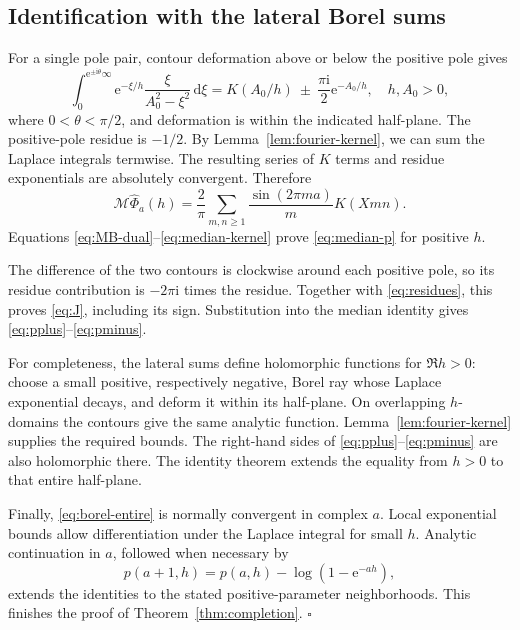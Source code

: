 \documentclass[11pt,a4paper]{article}
\numberwithin{equation}{section}
\theoremstyle{definition}
\theoremstyle{remark}\newtheorem{remark}[theorem]{Remark}
\newcommand{\ii}{\mathrm i}\newcommand{\e}{\mathrm e}
\newcommand{\dd}{\,\mathrm d}\newcommand{\id}{\operatorname{id}}
\newcommand{\Med}{\mathcal M}\newcommand{\eps}{\varepsilon}
\begin{document}
\subsection{Identification with the lateral Borel sums}
For a single pole pair, contour deformation above or below the positive
pole gives
\begin{equation}\label{eq:single-pole-laplace}
 \int_{0}^{\e^{\pm\ii\theta}\infty}
 \e^{-\xi/h}\frac{\xi}{A_0^2-\xi^2}\dd\xi
   =K(A_0/h)\ \pm\ \frac{\pi\ii}{2}\e^{-A_0/h},
 \quad h,A_0>0,
\end{equation}
where $0<\theta<\pi/2$, and deformation is within the indicated
half-plane. The positive-pole residue is $-1/2$.
By Lemma~\ref{lem:fourier-kernel}, we can sum the Laplace integrals
termwise. The resulting series of $K$ terms and residue exponentials
are absolutely convergent. Therefore
\begin{equation}\label{eq:median-kernel}
 \Med\widehat\Phi_a(h)
 =\frac2\pi\sum_{m,n\ge1}\frac{\sin(2\pi ma)}m K(Xmn).
\end{equation}
Equations \eqref{eq:MB-dual}--\eqref{eq:median-kernel} prove
\eqref{eq:median-p} for positive $h$.

The difference of the two contours is clockwise around each positive
pole, so its residue contribution is $-2\pi\ii$ times the residue.
Together with \eqref{eq:residues}, this proves \eqref{eq:J}, including
its sign. Substitution into the median identity gives
\eqref{eq:pplus}--\eqref{eq:pminus}.

For completeness, the lateral sums define holomorphic functions for
$\Re h>0$: choose a small positive, respectively negative, Borel ray
whose Laplace exponential decays, and deform it within its half-plane.
On overlapping $h$-domains the contours give the same analytic function.
Lemma~\ref{lem:fourier-kernel} supplies the required bounds. The
right-hand sides of \eqref{eq:pplus}--\eqref{eq:pminus} are also
holomorphic there. The identity theorem extends the equality from
$h>0$ to that entire half-plane.

Finally, \eqref{eq:borel-entire} is normally convergent in complex $a$.
Local exponential bounds allow differentiation under the Laplace
integral for small $h$. Analytic continuation in $a$, followed when
necessary by
\begin{equation}\label{eq:p-recurrence}
 p(a+1,h)=p(a,h)-\log(1-\e^{-ah}),
\end{equation}
extends the identities to the stated positive-parameter neighborhoods.
This finishes the proof of Theorem~\ref{thm:completion}.
\hfill$\square$
\end{document}
